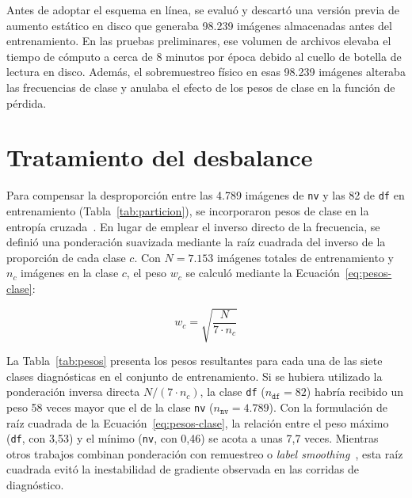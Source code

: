 Antes de adoptar el esquema en línea, se evaluó y descartó una versión previa de aumento estático en disco que generaba 98.239 imágenes almacenadas antes del entrenamiento. En las pruebas preliminares, ese volumen de archivos elevaba el tiempo de cómputo a cerca de 8 minutos por época debido al cuello de botella de lectura en disco. Además, el sobremuestreo físico en esas 98.239 imágenes alteraba las frecuencias de clase y anulaba el efecto de los pesos de clase en la función de pérdida.

\section{Tratamiento del desbalance}

Para compensar la desproporción entre las 4.789 imágenes de \texttt{nv} y las 82 de \texttt{df} en entrenamiento (Tabla~\ref{tab:particion}), se incorporaron pesos de clase en la entropía cruzada~\cite{hu2024multiscale}. En lugar de emplear el inverso directo de la frecuencia, se definió una ponderación suavizada mediante la raíz cuadrada del inverso de la proporción de cada clase $c$. Con $N = 7.153$ imágenes totales de entrenamiento y $n_c$ imágenes en la clase $c$, el peso $w_c$ se calculó mediante la Ecuación~\ref{eq:pesos-clase}:

\begin{equation}
  w_c = \sqrt{\frac{N}{7 \cdot n_c}}
  \label{eq:pesos-clase}
\end{equation}

La Tabla~\ref{tab:pesos} presenta los pesos resultantes para cada una de las siete clases diagnósticas en el conjunto de entrenamiento. Si se hubiera utilizado la ponderación inversa directa $N / (7 \cdot n_c)$, la clase \texttt{df} ($n_{\texttt{df}} = 82$) habría recibido un peso 58 veces mayor que el de la clase \texttt{nv} ($n_{\texttt{nv}} = 4.789$). Con la formulación de raíz cuadrada de la Ecuación~\ref{eq:pesos-clase}, la relación entre el peso máximo (\texttt{df}, con 3,53) y el mínimo (\texttt{nv}, con 0,46) se acota a unas 7,7 veces. Mientras otros trabajos combinan ponderación con remuestreo o \textit{label smoothing}~\cite{hu2024multiscale}, esta raíz cuadrada evitó la inestabilidad de gradiente observada en las corridas de diagnóstico.

